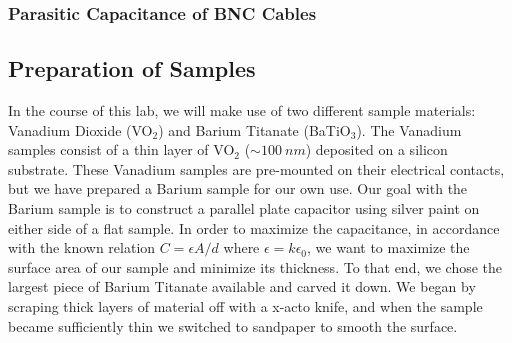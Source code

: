 \documentclass[%
 reprint,
 amsmath,amssymb,
 aps,
 pra,
]{revtex4-1}
\begin{document}
\subsubsection{Parasitic Capacitance of BNC Cables}

\subsection{Preparation of Samples}

In the course of this lab, we will make use of two different sample materials: Vanadium Dioxide (VO$_2$) and Barium Titanate (BaTiO$_3$). The Vanadium samples consist of a thin layer of VO$_2$ ($\sim 100~nm$) deposited on a silicon substrate. These Vanadium samples are pre-mounted on their electrical contacts, but we have prepared a Barium sample for our own use. Our goal with the Barium sample is to construct a parallel plate capacitor using silver paint on either side of a flat sample. In order to maximize the capacitance, in accordance with the known relation $C = \epsilon A/d$ where $\epsilon = k \epsilon_0$, we want to maximize the surface area of our sample and minimize its thickness. To that end, we chose the largest piece of Barium Titanate available and carved it down. We began by scraping thick layers of material off with a x-acto knife, and when the sample became sufficiently thin we switched to sandpaper to smooth the surface.
\end{document}
